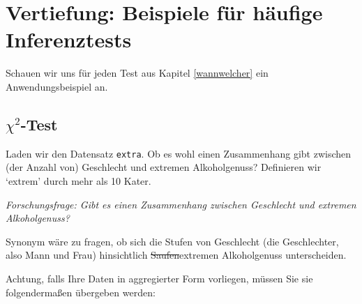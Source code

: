 \documentclass[12pt,ngerman,]{book}
\makeatletter
\newenvironment{Shaded}{\begin{snugshade}}{\end{snugshade}}
\newcommand{\KeywordTok}[1]{\textcolor[rgb]{0.13,0.29,0.53}{\textbf{#1}}}
\newcommand{\DataTypeTok}[1]{\textcolor[rgb]{0.13,0.29,0.53}{#1}}
\newcommand{\DecValTok}[1]{\textcolor[rgb]{0.00,0.00,0.81}{#1}}
\newcommand{\StringTok}[1]{\textcolor[rgb]{0.31,0.60,0.02}{#1}}
\newcommand{\CommentTok}[1]{\textcolor[rgb]{0.56,0.35,0.01}{\textit{#1}}}
\newcommand{\OperatorTok}[1]{\textcolor[rgb]{0.81,0.36,0.00}{\textbf{#1}}}
\newcommand{\NormalTok}[1]{#1}
\newenvironment{kframe}{%
\medskip{}
\setlength{\fboxsep}{.8em}
 \def\at@end@of@kframe{}%
 \ifinner\ifhmode%
  \def\at@end@of@kframe{\end{minipage}}%
  \begin{minipage}{\columnwidth}%
 \fi\fi%
 \def\FrameCommand##1{\hskip\@totalleftmargin \hskip-\fboxsep
 \colorbox{shadecolor}{##1}\hskip-\fboxsep
     \hskip-\linewidth \hskip-\@totalleftmargin \hskip\columnwidth}%
 \MakeFramed {\advance\hsize-\width
   \@totalleftmargin\z@ \linewidth\hsize
   \@setminipage}}%
 {\par\unskip\endMakeFramed%
 \at@end@of@kframe}
\renewenvironment{Shaded}{\begin{kframe}}{\end{kframe}}
\theoremstyle{definition}
\theoremstyle{definition}
\theoremstyle{remark}
\makeatother
\begin{document}
\section{Vertiefung: Beispiele für häufige
Inferenztests}\label{vertiefung-beispiele-fur-haufige-inferenztests}

Schauen wir uns für jeden Test aus Kapitel \ref{wannwelcher} ein
Anwendungsbeispiel an.

\subsection{\texorpdfstring{\(\chi^2\)-Test}{\textbackslash{}chi\^{}2-Test}}\label{chi2-test}

Laden wir den Datensatz \texttt{extra}. Ob es wohl einen Zusammenhang
gibt zwischen (der Anzahl von) Geschlecht und extremen Alkoholgenuss?
Definieren wir `extrem' durch mehr als 10 Kater.

\emph{Forschungsfrage: Gibt es einen Zusammenhang zwischen Geschlecht
und extremen Alkoholgenuss?}

Synonym wäre zu fragen, ob sich die Stufen von Geschlecht (die
Geschlechter, also Mann und Frau) hinsichtlich \sout{Saufen}extremen
Alkoholgenuss unterscheiden.

\begin{Shaded}
\end{Shaded}

Achtung, falls Ihre Daten in aggregierter Form vorliegen, müssen Sie sie
folgendermaßen übergeben werden:

\begin{Shaded}
\end{Shaded}
\end{document}

